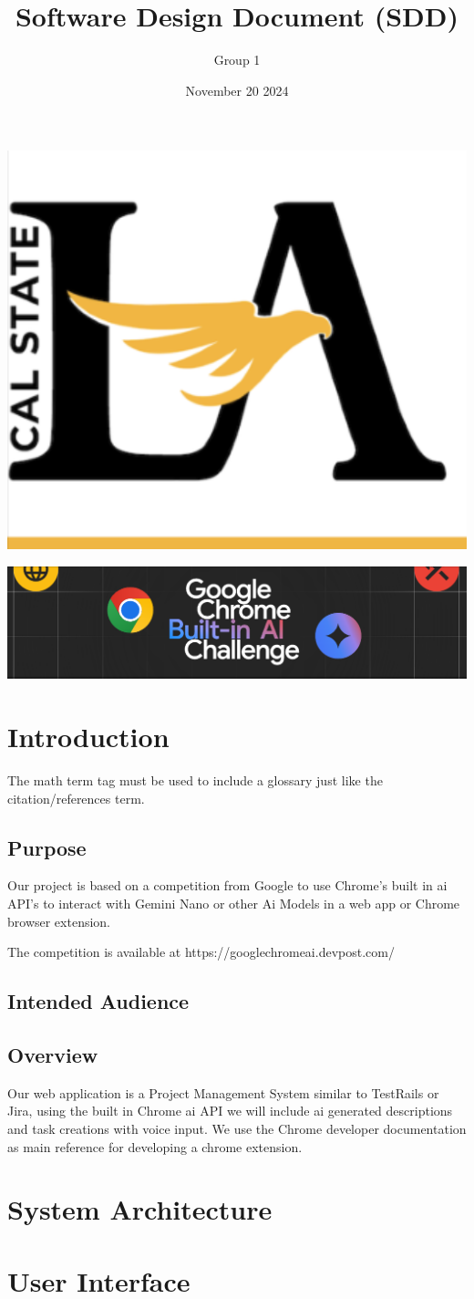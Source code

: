 \documentclass{article}
\title{Software Design Document (SDD)}
\author{Group 1 }
\date{November 20 2024}
\begin{document}
\maketitle  
\pagebreak

\tableofcontents
\pagebreak

\includegraphics[width=0.3\linewidth]{./logo/csula.png} 

\includegraphics[width=0.3\linewidth]{./logo/chromeai.png} 
\section{Introduction}
The \Gls{math} term tag must be used to include a glossary just like the citation/references \gls{term}. 
\subsection{Purpose}
Our project is based on a competition from Google to use Chrome's built in \Gls{ai} API's to interact with Gemini Nano or other Ai Models in a web app or Chrome browser extension. 

The competition is available at https://googlechromeai.devpost.com/

\subsection{Intended Audience}
\lipsum[2]

\subsection{Overview}
Our web application is a Project Management System similar to TestRails or Jira, using the built in Chrome \Gls{ai} API we will include ai generated descriptions and task creations with voice input. We use the Chrome developer documentation\cite{dev} as main reference for developing a chrome extension.

\section{System Architecture}
 
\section{User Interface}
 

\pagebreak
\printglossaries

\printbibliography
\end{document}
